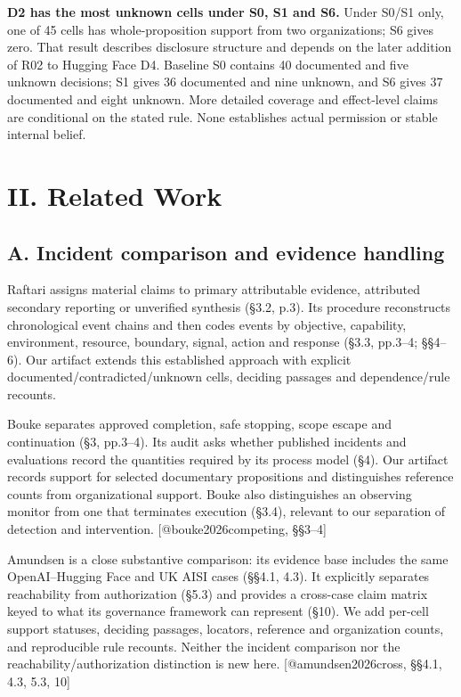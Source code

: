 \documentclass[conference]{IEEEtran}
\providecommand{\citep}[1]{\cite{#1}}
\begin{document}
\textbf{D2 has the most unknown cells under S0, S1 and S6.} Under S0/S1 only, one of 45 cells has whole-proposition support from two organizations; S6 gives zero. That result describes disclosure structure and depends on the later addition of R02 to Hugging Face D4. Baseline S0 contains 40 documented and five unknown decisions; S1 gives 36 documented and nine unknown, and S6 gives 37 documented and eight unknown. More detailed coverage and effect-level claims are conditional on the stated rule. None establishes actual permission or stable internal belief.

\section{II. Related Work}

\subsection{A. Incident comparison and evidence handling}

Raftari assigns material claims to primary attributable evidence, attributed secondary reporting or unverified synthesis (§3.2, p.3). Its procedure reconstructs chronological event chains and then codes events by objective, capability, environment, resource, boundary, signal, action and response (§3.3, pp.3--4; §§4--6). Our artifact extends this established approach with explicit documented/contradicted/unknown cells, deciding passages and dependence/rule recounts. \citep{raftari2026from}

Bouke separates approved completion, safe stopping, scope escape and continuation (§3, pp.3--4). Its audit asks whether published incidents and evaluations record the quantities required by its process model (§4). Our artifact records support for selected documentary propositions and distinguishes reference counts from organizational support. Bouke also distinguishes an observing monitor from one that terminates execution (§3.4), relevant to our separation of detection and intervention. [@bouke2026competing, §§3--4]

Amundsen is a close substantive comparison: its evidence base includes the same OpenAI--Hugging Face and UK AISI cases (§§4.1, 4.3). It explicitly separates reachability from authorization (§5.3) and provides a cross-case claim matrix keyed to what its governance framework can represent (§10). We add per-cell support statuses, deciding passages, locators, reference and organization counts, and reproducible rule recounts. Neither the incident comparison nor the reachability/authorization distinction is new here. [@amundsen2026cross, §§4.1, 4.3, 5.3, 10]
\end{document}
